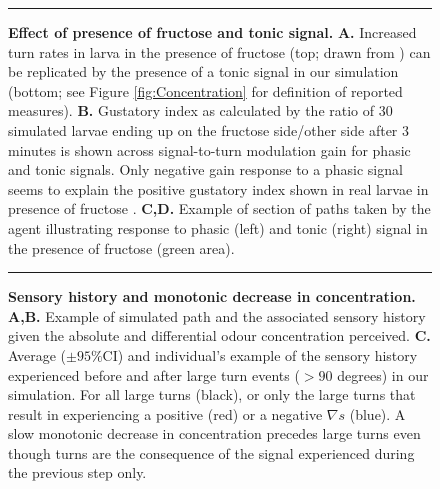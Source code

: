 \documentclass[11pt,a4paper]{article}
\newcommand{\todoBW}[1]{\todo[author=BW,color=orange, size=\tiny,inline]{#1}}
\begin{document}
\begin{figure}
\begin{center}
\caption{{\bf Effect of presence of fructose and tonic signal.}
{\bf A.} Increased turn rates in larva in the presence of fructose (top; drawn from \citep{schleyer2015learning}) can be replicated by the presence of a tonic signal in our simulation (bottom; see Figure \ref{fig:Concentration} for definition of reported measures). 
{\bf B.} Gustatory index as calculated by the ratio of 30 simulated larvae ending up on the fructose side/other side after 3 minutes is shown across signal-to-turn modulation gain for phasic and tonic signals. Only negative gain response to a phasic signal seems to explain the positive gustatory index shown in real larvae in presence of fructose \citep{schleyer2011behavior}.
{\bf C,D.} Example of section of paths taken by the agent illustrating response to phasic (left) and tonic (right) signal in the presence of fructose (green area).
\label{fig:Tonic}}
\hrule
\end{center}
\end{figure}


\begin{figure}
\begin{center}
\caption{{\bf Sensory history and monotonic decrease in concentration.} {\bf A,B.} Example of simulated path and the associated sensory history given the absolute and differential odour concentration perceived.
{\bf  C.} Average ($\pm 95\%$CI) and individual’s example of the sensory history experienced before and after large turn events ($>90$ degrees) in our simulation. For all large turns (black), or only the large turns that result in experiencing a positive (red) or a negative $\nabla s$ (blue). A slow monotonic decrease in concentration precedes large turns even though turns are the consequence of the signal experienced during the previous step only.
\label{fig:SensoryHistory}}
\hrule
\end{center}
\end{figure}
\end{document}
